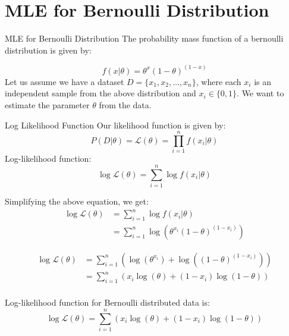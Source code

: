 \documentclass{beamer}
\begin{document}
\section{MLE for Bernoulli Distribution}
\begin{frame}{MLE for Bernoulli Distribution}
The probability mass function of a bernoulli distribution is given by:

\begin{equation}
f(x|\theta) = \theta^x(1-\theta)^{(1-x)}
\end{equation}
Let us assume we have a dataset $D = \{x_1, x_2, \ldots, x_n\}$, where each $x_i$ is an independent sample from the above distribution and $x_i\in\{0, 1\}$.
We want to estimate the parameter $\theta$ from the data.


\end{frame}

\begin{frame}{Log Likelihood Function}
Our likelihood function is given by:
\begin{equation}
P(D|\theta) = \mathcal{L}(\theta) = \prod_{i=1}^n f(x_i|\theta)
\end{equation}
    Log-likelihood function:
    \begin{equation}
        \log \mathcal{L}(\theta) = \sum_{i=1}^n \log f(x_i|\theta)
    \end{equation}

    Simplifying the above equation, we get:
    \begin{align*}
        \log \mathcal{L}(\theta) &= \sum_{i=1}^n \log f(x_i|\theta) \\
        &= \sum_{i=1}^n \log \left (\theta^{x_{i}}(1-\theta)^{(1-x_{i})} \right)         
        \end{align*}
\end{frame}
\begin{frame}
   
    \begin{align*}
        \log \mathcal{L}(\theta) &=  \sum_{i=1}^n \left( \log \left( \theta^{x_{i}} \right) + \log \left( (1-\theta)^{(1-x_{i})}  \right) \right) \\
        &=\sum_{i=1}^n \left (x_{i}\log \left( \theta \right) + (1-x_{i})\log \left(1-\theta \right) \right)\\
        \end{align*}
        \begin{tcolorbox}[colback=metropolisblue!5,colframe=metropolisblue,title=Log Likelihood Function for Bernoulli Distribution]
            Log-likelihood function for Bernoulli distributed data is:
            \[
                \log \mathcal{L}(\theta) = \sum_{i=1}^n  (x_{i}\log(\theta) + (1-x_{i})\log(1-\theta))
                \]
        \end{tcolorbox}
\end{frame}
\end{document}

